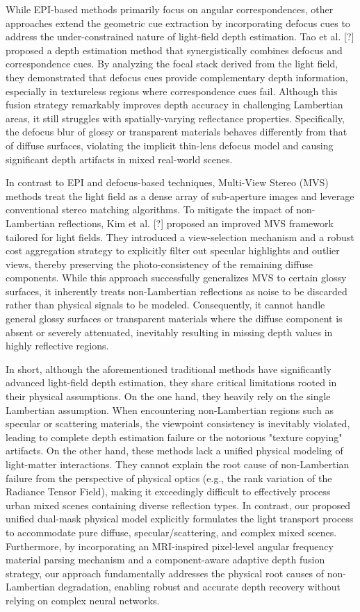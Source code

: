 \documentclass[journal]{IEEEtran}
\begin{document}
While EPI-based methods primarily focus on angular correspondences, other approaches extend the geometric cue extraction by incorporating defocus cues to address the under-constrained nature of light-field depth estimation. Tao et al. [?] proposed a depth estimation method that synergistically combines defocus and correspondence cues. By analyzing the focal stack derived from the light field, they demonstrated that defocus cues provide complementary depth information, especially in textureless regions where correspondence cues fail. Although this fusion strategy remarkably improves depth accuracy in challenging Lambertian areas, it still struggles with spatially-varying reflectance properties. Specifically, the defocus blur of glossy or transparent materials behaves differently from that of diffuse surfaces, violating the implicit thin-lens defocus model and causing significant depth artifacts in mixed real-world scenes.

In contrast to EPI and defocus-based techniques, Multi-View Stereo (MVS) methods treat the light field as a dense array of sub-aperture images and leverage conventional stereo matching algorithms. To mitigate the impact of non-Lambertian reflections, Kim et al. [?] proposed an improved MVS framework tailored for light fields. They introduced a view-selection mechanism and a robust cost aggregation strategy to explicitly filter out specular highlights and outlier views, thereby preserving the photo-consistency of the remaining diffuse components. While this approach successfully generalizes MVS to certain glossy surfaces, it inherently treats non-Lambertian reflections as noise to be discarded rather than physical signals to be modeled. Consequently, it cannot handle general glossy surfaces or transparent materials where the diffuse component is absent or severely attenuated, inevitably resulting in missing depth values in highly reflective regions.

In short, although the aforementioned traditional methods have significantly advanced light-field depth estimation, they share critical limitations rooted in their physical assumptions. On the one hand, they heavily rely on the single Lambertian assumption. When encountering non-Lambertian regions such as specular or scattering materials, the viewpoint consistency is inevitably violated, leading to complete depth estimation failure or the notorious "texture copying" artifacts. On the other hand, these methods lack a unified physical modeling of light-matter interactions. They cannot explain the root cause of non-Lambertian failure from the perspective of physical optics (e.g., the rank variation of the Radiance Tensor Field), making it exceedingly difficult to effectively process urban mixed scenes containing diverse reflection types. In contrast, our proposed unified dual-mask physical model explicitly formulates the light transport process to accommodate pure diffuse, specular/scattering, and complex mixed scenes. Furthermore, by incorporating an MRI-inspired pixel-level angular frequency material parsing mechanism and a component-aware adaptive depth fusion strategy, our approach fundamentally addresses the physical root causes of non-Lambertian degradation, enabling robust and accurate depth recovery without relying on complex neural networks.
\end{document}
